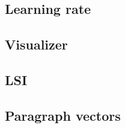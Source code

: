 \subsection{Learning rate}


\subsection{Visualizer}
\subsection{LSI}
\subsection{Paragraph vectors}


